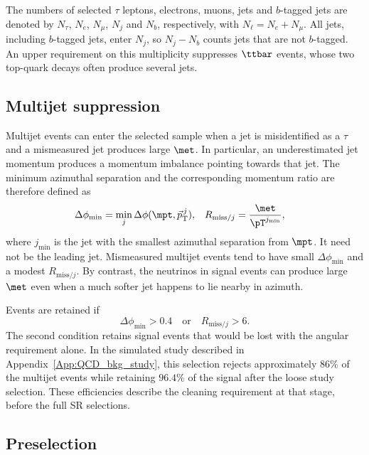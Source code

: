 The numbers of selected $\tau$ leptons, electrons, muons, jets and $b$-tagged jets are denoted by $N_\tau$, $N_e$, $N_\mu$, $N_j$ and $N_b$, respectively, with $N_\ell=N_e+N_\mu$.
    All jets, including $b$-tagged jets, enter $N_j$, so $N_j-N_b$ counts jets that are not $b$-tagged.
    An upper requirement on this multiplicity suppresses $\ttbar$ events, whose two top-quark decays often produce several jets.

\subsection{Multijet suppression}
\label{subsec:ch7_multijet}

Multijet events can enter the selected sample when a jet is misidentified as a $\tau$ and a mismeasured jet produces large $\met$.
In particular, an underestimated jet momentum produces a momentum imbalance pointing towards that jet.
The minimum azimuthal separation and the corresponding momentum ratio are therefore defined as
\begin{align}
    \Delta\phi_{\min} &= \min_j\Delta\phi(\mpt,\vec p_{\mathrm{T}}^{\,j}),
    &R_{\mathrm{miss}/j} &= \frac{\met}{\pT^{j_{\min}}},
    \label{eq:ch7_qcd_variables}
\end{align}
where $j_{\min}$ is the jet with the smallest azimuthal separation from $\mpt$.
It need not be the leading jet.
Mismeasured multijet events tend to have small $\Delta\phi_{\min}$ and a modest $R_{\mathrm{miss}/j}$.
By contrast, the neutrinos in signal events can produce large $\met$ even when a much softer jet happens to lie nearby in azimuth.

Events are retained if
\begin{equation}
    \Delta\phi_{\min}>0.4
    \quad\text{or}\quad
    R_{\mathrm{miss}/j}>6.
    \label{eq:ch7_qcd_cut}
\end{equation}
The second condition retains signal events that would be lost with the angular requirement alone.
In the simulated study described in Appendix~\ref{App:QCD_bkg_study}, this selection rejects approximately $86\%$ of the multijet events while retaining $96.4\%$ of the signal after the loose study selection.
These efficiencies describe the cleaning requirement at that stage, before the full SR selections.

\subsection{Preselection}
\label{subsec:ch7_common_preselection}

